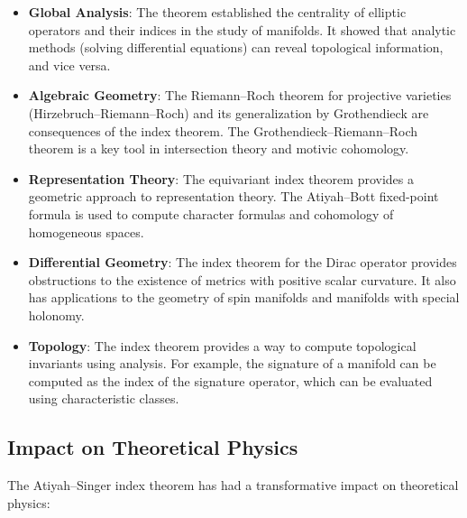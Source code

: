 \begin{itemize}
\item \textbf{Global Analysis}: The theorem established the centrality of elliptic operators and their indices in the study of manifolds. It showed that analytic methods (solving differential equations) can reveal topological information, and vice versa.

\item \textbf{Algebraic Geometry}: The Riemann--Roch theorem for projective varieties (Hirzebruch--Riemann--Roch) and its generalization by Grothendieck are consequences of the index theorem. The Grothendieck--Riemann--Roch theorem is a key tool in intersection theory and motivic cohomology.

\item \textbf{Representation Theory}: The equivariant index theorem provides a geometric approach to representation theory. The Atiyah--Bott fixed-point formula is used to compute character formulas and cohomology of homogeneous spaces.

\item \textbf{Differential Geometry}: The index theorem for the Dirac operator provides obstructions to the existence of metrics with positive scalar curvature. It also has applications to the geometry of spin manifolds and manifolds with special holonomy.

\item \textbf{Topology}: The index theorem provides a way to compute topological invariants using analysis. For example, the signature of a manifold can be computed as the index of the signature operator, which can be evaluated using characteristic classes.
\end{itemize}

\subsection{Impact on Theoretical Physics}

The Atiyah--Singer index theorem has had a transformative impact on theoretical physics:

